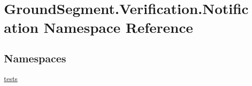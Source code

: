 \hypertarget{namespace_ground_segment_1_1_verification_1_1_notification}{}\section{Ground\+Segment.\+Verification.\+Notification Namespace Reference}
\label{namespace_ground_segment_1_1_verification_1_1_notification}
\subsection*{Namespaces}
\begin{DoxyCompactItemize}
\item 
 \hyperlink{namespace_ground_segment_1_1_verification_1_1_notification_1_1tests}{tests}
\end{DoxyCompactItemize}
